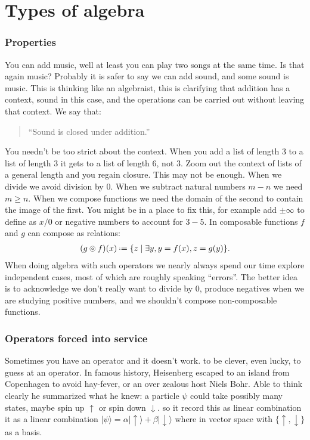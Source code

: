 \chapter{Types of algebra}
\subsection{Properties}
You can add music, well at least you can play two songs at the same time.
Is that again music?  Probably it is safer to say we can add sound, and 
some sound is music.  This is thinking like an algebraist, this is 
clarifying that addition has a context, sound in this case,
and the operations can be carried out without leaving that context.
We say that:
\begin{quote}
    ``Sound is closed under addition.''
\end{quote}
You needn't be too strict about the context.
When you add a list of length 3 to a 
list of length 3 it gets to a list of length 6, not 3.
Zoom out the context of lists of a general length and 
you regain closure.  This may not be enough.  When we divide 
we avoid division by $0$.  When we subtract natural numbers $m-n$
we need $m\geq n$.  When we compose functions we need the 
domain of the second to contain the image of the first.
You might be in a place to fix this, for example add $\pm\infty$ 
to define as $x/0$ or negative numbers to account for $3-5$.
In composable functions $f$ and $g$ can compose as relations:
\begin{align*}
    (g\circledcirc f)(x) \defeq \{z\mid \exists y, y=f(x), z=g(y)\}.
\end{align*}
When doing algebra with such operators we nearly always spend 
our time explore independent cases, most of which are 
roughly speaking ``errors''.  The better idea is to acknowledge 
we don't really want to divide by 0, produce negatives when we 
are studying positive numbers, and we shouldn't compose 
non-composable functions.


\subsection{Operators forced into service}
Sometimes you have an operator and it doesn't work.
to be clever, even lucky, to guess at an operator.
In famous history, Heisenberg escaped to an island from Copenhagen 
to avoid hay-fever, or an over zealous host Niels Bohr. 
Able to think clearly he summarized what he knew: a particle $\psi$
could take possibly many states, maybe spin up $\uparrow$ or spin down 
$\downarrow$.  so it record this as linear combination
it as a linear combination $|\psi\rangle = \alpha|\uparrow\rangle+\beta|\downarrow\rangle$
where in vector space with $\{\uparrow,\downarrow\}$ as a basis. 


